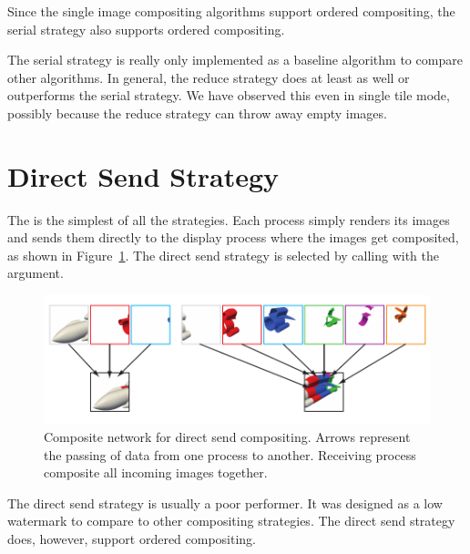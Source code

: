 Since the single image compositing algorithms support ordered
compositing, the serial strategy also supports ordered compositing.

The serial strategy is really only implemented as a baseline algorithm to
compare other algorithms.  In general, the reduce strategy does at least as
well or outperforms the serial strategy.  We have observed this even in
single tile mode, possibly because the reduce strategy can throw away empty
images.


\section{Direct Send Strategy}
\label{sec:Strategies:DirectSend}


The  is the simplest of all the strategies.
Each process simply renders its images and sends them directly to the
display process where the images get composited, as shown in
Figure~\ref{fig:DirectSend}.  The direct send strategy is selected by
calling  with the 
argument.

\begin{figure}
  \centering
  \includegraphics{images/DirectSend}
  \caption[Direct send compositing network.]{Composite network for direct
    send compositing.  Arrows represent the passing of data from one
    process to another.  Receiving process composite all incoming images
    together.}
  \label{fig:DirectSend}
\end{figure}

The direct send strategy is usually a poor performer.  It was designed as a
low watermark to compare to other compositing strategies.  The direct send
strategy does, however, support ordered compositing.


